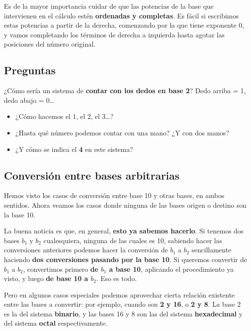 \documentclass[spanish,a4paper,]{article}
\providecommand{\tightlist}{%
  \setlength{\itemsep}{0pt}\setlength{\parskip}{0pt}}
\begin{document}
Es de la mayor importancia cuidar de que las potencias de la base que
intervienen en el cálculo estén \textbf{ordenadas y completas}. Es fácil
si escribimos estas potencias a partir de la derecha, comenzando por la
que tiene exponente 0, y vamos completando los términos de derecha a
izquierda hasta agotar las posiciones del número original.

\hypertarget{preguntas-1}{%
\subsection{Preguntas}\label{preguntas-1}}

¿Cómo sería un sistema de \textbf{contar con los dedos en base 2}? Dedo
arriba = 1, dedo abajo = 0\ldots{}

\begin{itemize}
\tightlist
\item
  ¿Cómo hacemos el 1, el 2, el 3\ldots{}?
\item
  ¿Hasta qué número podemos contar con una mano? ¿Y con dos manos?
\item
  ¿Y cómo se indica el \textbf{4} en este sistema?
\end{itemize}

\hypertarget{conversiuxf3n-entre-bases-arbitrarias}{%
\subsection{Conversión entre bases
arbitrarias}\label{conversiuxf3n-entre-bases-arbitrarias}}

Hemos visto los casos de conversión entre base 10 y otras bases, en
ambos sentidos. Ahora veamos los casos donde ninguna de las bases origen
o destino son la base 10.

La buena noticia es que, en general, \textbf{esto ya sabemos hacerlo}.
Si tenemos dos bases \(b_1\) y \(b_2\) cualesquiera, ninguna de las
cuales es 10, sabiendo hacer las conversiones anteriores podemos hacer
la conversión de \(b_1\) a \(b_2\) sencillamente haciendo \textbf{dos
conversiones pasando por la base 10}. Si queremos convertir de \(b_1\) a
\(b_2\), convertimos primero \textbf{de \(b_1\) a base 10}, aplicando el
procedimiento ya visto, y luego \textbf{de base 10 a \(b_2\)}. Eso es
todo.

Pero en algunos casos especiales podemos aprovechar cierta relación
existente entre las bases a convertir: por ejemplo, cuando son \textbf{2
y 16}, o \textbf{2 y 8}. La base 2 es la del sistema \textbf{binario}, y
las bases 16 y 8 son las del sistema \textbf{hexadecimal} y del sistema
\textbf{octal} respectivamente.
\end{document}
